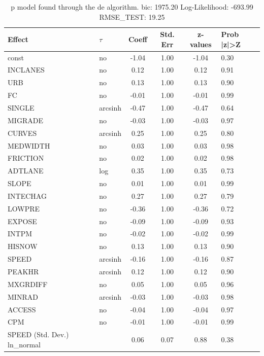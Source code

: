 \begin{table}
	\caption{p model found through the de algorithm. bic: 1975.20 Log-Likelihood: -693.99 RMSE_TEST: 19.25}
	\begin{center}
		\begin{tabular}{|l|l|c|c|c|l|}
			\hline
			Effect & $\tau$ & Coeff & Std. Err & z-values & Prob |z|>Z \\
			\hline
			const & no & -1.04 & 1.00 & -1.04 & 0.30 \\
			\hline
			INCLANES & no & 0.12 & 1.00 & 0.12 & 0.91 \\
			\hline
			URB & no & 0.13 & 1.00 & 0.13 & 0.90 \\
			\hline
			FC & no & -0.01 & 1.00 & -0.01 & 0.99 \\
			\hline
			SINGLE & arcsinh & -0.47 & 1.00 & -0.47 & 0.64 \\
			\hline
			MIGRADE & no & -0.03 & 1.00 & -0.03 & 0.97 \\
			\hline
			CURVES & arcsinh & 0.25 & 1.00 & 0.25 & 0.80 \\
			\hline
			MEDWIDTH & no & 0.03 & 1.00 & 0.03 & 0.98 \\
			\hline
			FRICTION & no & 0.02 & 1.00 & 0.02 & 0.98 \\
			\hline
			ADTLANE & log & 0.35 & 1.00 & 0.35 & 0.73 \\
			\hline
			SLOPE & no & 0.01 & 1.00 & 0.01 & 0.99 \\
			\hline
			INTECHAG & no & 0.27 & 1.00 & 0.27 & 0.79 \\
			\hline
			LOWPRE & no & -0.36 & 1.00 & -0.36 & 0.72 \\
			\hline
			EXPOSE & no & -0.09 & 1.00 & -0.09 & 0.93 \\
			\hline
			INTPM & no & -0.02 & 1.00 & -0.02 & 0.99 \\
			\hline
			HISNOW & no & 0.13 & 1.00 & 0.13 & 0.90 \\
			\hline
			SPEED & arcsinh & -0.16 & 1.00 & -0.16 & 0.87 \\
			\hline
			PEAKHR & arcsinh & 0.12 & 1.00 & 0.12 & 0.90 \\
			\hline
			MXGRDIFF & no & 0.05 & 1.00 & 0.05 & 0.96 \\
			\hline
			MINRAD & arcsinh & -0.03 & 1.00 & -0.03 & 0.98 \\
			\hline
			ACCESS & no & -0.04 & 1.00 & -0.04 & 0.97 \\
			\hline
			CPM & no & -0.01 & 1.00 & -0.01 & 0.99 \\
			\hline
			SPEED (Std. Dev.) ln_normal &  & 0.06 & 0.07 & 0.88 & 0.38 \\

\end{tabular}
\end{center}
\end{table}
